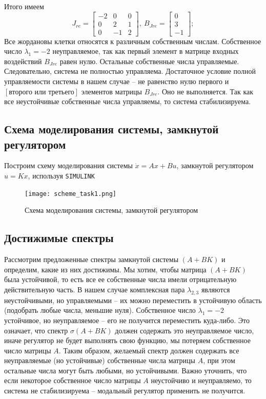 \documentclass[a4paper, 12pt]{article}
\begin{document}
    Итого имеем
    $$
    J_{re}=\begin{bmatrix}
        -2     &0     &0\\
         0     &2     &1\\
         0    &-1     &2
        \end{bmatrix},\ B_{Jre}=\begin{bmatrix}
            0\\
         3\\
        -1
        \end{bmatrix};
    $$
    Все жордановы клетки относятся к различным собственным числам. Собственное число $\lambda_1=-2$ неуправляемое, так как первый элемент в матрице
    входных воздействий $B_{Jre}$ равен нулю. Остальные собственные числа управляемые.
    Следовательно, система не полностью управляема. Достаточное условие полной управляемости
    системы в нашем случае -- не равенство нулю первого и $\left[\text{второго или третьего}\right]$
    элементов матрицы $B_{Jre}$. Оно не выполняется. Так как все неустойчивые собственные числа
    управляемы, то система стабилизируема.


    \subsection{Схема моделирования системы, замкнутой регулятором}
    Построим схему моделирования системы $\dot{x}=Ax+Bu$, замкнутой регулятором $u=Kx$, используя \texttt{SIMULINK}
    \begin{figure}[H]
        \centering
        \texttt{[image: scheme\_task1.png]}
        \captionsetup{skip=0pt}
        \caption{Схема моделирования системы, замкнутой регулятором}
        \label{fig:scheme_task1}
    \end{figure}


    \subsection{Достижимые спектры}
    Рассмотрим предложенные спектры замкнутой системы $\left(A+BK\right)$ и определим, какие из них достижимы.
    Мы хотим, чтобы матрица $\left(A+BK\right)$ была устойчивой, то есть все ее собственные числа имели
    отрицательную действительную часть. В нашем случае комплексная пара $\lambda_{2,3}$ являются неустойчивыми,
    но управляемыми -- их можно переместить в устойчивую область (подобрать любые числа, меньшие нуля). Собственное
    число $\lambda_1=-2$ устойчивое, но неуправляемое -- его не получится переместить куда-либо. Это означает, что
    спектр $\sigma\left(A+BK\right)$ должен содержать это неуправляемое число, иначе регулятор не будет выполнять свою
    функцию, мы потеряем собственное число матрицы $A$. Таким образом, желаемый спектр должен содержать все неуправляемые (но устойчивые)
    собственные числа матрицы $A$, при этом остальные числа могут быть любыми, но устойчивыми. Важно уточнить, что
    если некоторое собственное число матрицы $A$ неустойчиво и неуправляемо, то система не стабилизируема -- модальный
    регулятор применить не получится.
\end{document}
